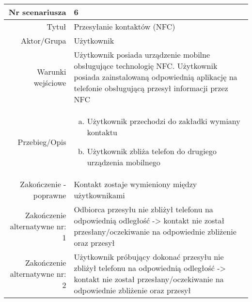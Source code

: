 \documentclass[12pt,a4paper]{article}
\begin{document}
\begin{tabular}{|r|l|} \hline
Nr scenariusza & 6 \\
\hline
Tytuł & Przesyłanie kontaktów (NFC) \\
\hline
Aktor/Grupa & Użytkownik \\
\hline
Warunki wejściowe & Użytkownik posiada urządzenie mobilne obsługujące technologię NFC. 
Użytkownik posiada zainstalowaną odpowiednią aplikację na telefonie obsługującą przesył informacji przez NFC
 \\
\hline
Przebieg/Opis & 
\begin{enumerate}[a)]
\item Użytkownik przechodzi do zakładki wymiany kontaktu
\item Użytkownik zbliża telefon do drugiego urządzenia mobilnego
\end{enumerate}
\\
\hline
Zakończenie - poprawne & Kontakt zostaje wymieniony między użytkownikami
\\ 
\hline
Zakończenie alternatywne nr: 1 & Odbiorca przesyłu nie zbliżył telefonu na odpowiednią odległość -> kontakt nie został przesłany/oczekiwanie na odpowiednie zbliżenie oraz przesył
\\
\hline
Zakończenie alternatywne nr: 2 & Użytkownik próbujący dokonać przesyłu nie zbliżył telefonu na odpowiednią odległość -> kontakt nie został przesłany/oczekiwanie na odpowiednie zbliżenie oraz przesył
\\
\hline
\end{tabular}
\end{document}
